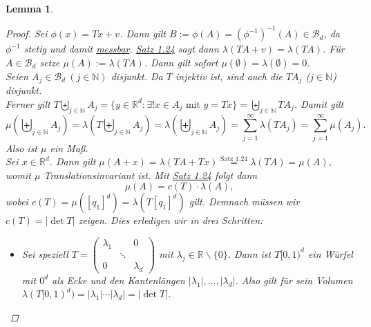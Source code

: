 \documentclass[a4paper]{report}
\newcommand{\R}{\mathbb{R}}
\newcommand{\N}{\mathbb{N}}
\newcommand{\Borel}{\mathcal{B}}
\newcommand{\Bd}{\Borel_d}
\newcommand{\bigdcup}{\biguplus}
\newcommand{\jshortlink}[1]{\jhyperref{#1}{\text{#1}}}
\newcommand{\jhyperref}[2]{\hyperref[j_#1]{#2}}
\newcommand{\jlink}[1]{\jhyperref{#1}{#1}}
\theoremstyle{plain}
\newtheorem{lem}[thm]{Lemma}
\theoremstyle{definition}
\begin{document}
{{{{\begin{lem}
    \begin{proof}
        Sei $\phi(x) = Tx+v$. Dann gilt $B:=\phi(A) = (\phi^{-1})^{-1}(A)\in \Bd$, da $\phi^{-1}$ stetig und damit \jlink{messbar}. \jlink{Satz 1.24} sagt dann $\lambda(TA+v) = \lambda(TA)$. Für $A\in \Bd$ setze $\mu(A):=\lambda(TA)$. Dann gilt sofort $\mu(\emptyset) = \lambda(\emptyset) = 0$.\\
        Seien $A_j\in \Bd \ (j\in \N)$ disjunkt. Da $T$ injektiv ist, sind auch die $TA_j$ ($j\in\N$) disjunkt.\\
        Ferner gilt $T\bigdcup_{j\in\N}A_j = \{y\in \R^d : \exists! x \in A_j \text{ mit } y=Tx\} = \bigdcup_{j\in\N}TA_j$. Damit gilt
        \begin{displaymath}
            \mu\left( \bigdcup_{j\in\N} A_j \right) = \lambda \left(T \bigdcup_{j\in\N} A_j \right) = \lambda \left(\bigdcup_{j\in\N} A_j \right) = \sum_{j=1}^\infty \lambda(TA_j) = \sum_{j=1}^\infty \mu(A_j).
        \end{displaymath}
        Also ist $\mu$ ein Maß.\\
        Sei $x\in\R^d$. Dann gilt $\mu(A+x)= \lambda(TA+Tx) \overset{\jshortlink{Satz 1.24}}{=} \lambda(TA) = \mu(A)$, womit $\mu$ Translationsinvariant ist. Mit \jlink{Satz 1.24} folgt dann
        \begin{displaymath}
            \tag{$*$}
            \mu(A) = c(T)\cdot \lambda(A),
        \end{displaymath}
        wobei $c(T) = \mu([q_1]^d) = \lambda(T[q_1]^d)$ gilt. Demnach müssen wir $c(T) = |\det T|$ zeigen. Dies erledigen wir in drei Schritten:
        \begin{itemize}
            \item[1)] 
                Sei speziell $T =  \left(
                                        \begin{smallmatrix}
                                             \lambda_1 &        &  0       \\
                                                       & \ddots &          \\
                                             0         &        & \lambda_d
                                        \end{smallmatrix}
                                  \right)$ mit $\lambda_j \in \R\backslash \{0\}$. Dann ist $T[0,1)^d$ ein Würfel mit $0^d$ als Ecke und den Kantenlängen $|\lambda_1|,\dots, |\lambda_d|$. Also gilt für sein Volumen $\lambda(T[0,1)^d) = |\lambda_1|\cdots|\lambda_d| = |\det T|$.
            

\end{itemize}
\end{proof}
\end{lem}}}}}
\end{document}
